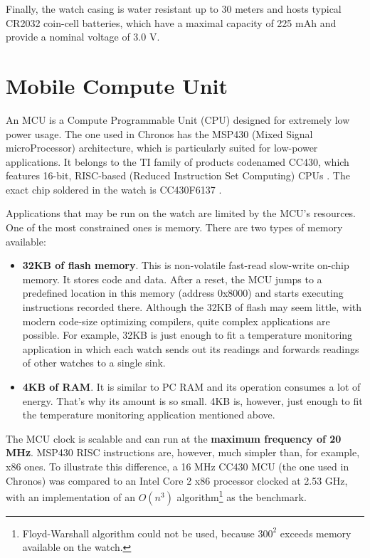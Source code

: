 Finally, the watch casing is water resistant up to 30 meters and hosts
typical CR2032 coin-cell batteries, which have a maximal capacity of
225 mAh and provide a nominal voltage of 3.0 V.

\section{Mobile Compute Unit}

An MCU is a Compute Programmable Unit (CPU) designed for extremely
low power usage. The one used in Chronos has the MSP430 (Mixed Signal
microProcessor) architecture, which is particularly suited for
low-power applications. It belongs to the TI family of products
codenamed CC430, which features 16-bit, RISC-based (Reduced Instruction
Set Computing) CPUs \cite{CC430ds}. The exact chip soldered in the
watch is CC430F6137 \cite{CC430F6137ds}.

Applications that may be run on the watch are limited by the MCU's
resources. One of the most constrained ones is memory. There are two types
of memory available:
\begin{itemize}
  \item {\bf 32KB of flash memory}. This is non-volatile fast-read
    slow-write on-chip memory. It stores code and data. After a reset,
    the MCU jumps to a predefined location in this memory (address
    0x8000) and starts executing instructions recorded there. Although
    the 32KB of flash may seem little, with modern code-size
    optimizing compilers, quite complex applications are possible. For
    example, 32KB is just enough to fit a temperature monitoring
    application in which each watch sends out its readings and forwards
    readings of other watches to a single sink.
  \item {\bf 4KB of RAM}. It is similar to PC RAM and its
    operation consumes a lot of energy. That's why its amount is so
    small. 4KB is, however, just enough to fit the temperature monitoring
    application mentioned above.
\end{itemize}

The MCU clock is scalable and can run at the {\bf maximum frequency of
20 MHz}.  MSP430 RISC instructions are, however, much simpler than,
for example, x86 ones. To illustrate this difference, a 16 MHz CC430
MCU (the one used in Chronos) was compared to an Intel Core 2 x86
processor clocked at 2.53 GHz, with an implementation of an $O(n^3)$
algorithm\footnote{Floyd-Warshall algorithm could not be used, because $300^2$
exceeds memory available on the watch.} as the benchmark.

